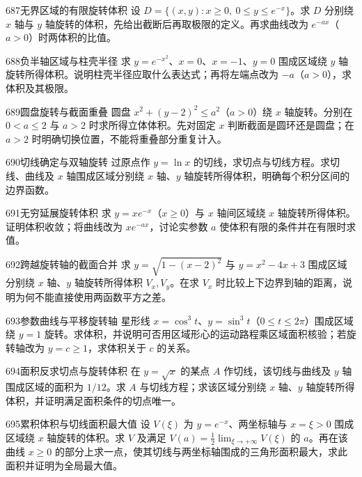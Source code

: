 \begin{exercise}{687}{无界区域的有限旋转体积}
设 $D=\{(x,y):x\ge0,\ 0\le y\le e^{-x}\}$。求 $D$ 分别绕 $x$ 轴与 $y$ 轴旋转的体积，先给出截断后再取极限的定义。再求曲线改为 $e^{-ax}$（$a>0$）时两体积的比值。
\end{exercise}
\begin{exercise}{688}{负半轴区域与柱壳半径}
求 $y=e^{-x^2}$、$x=0$、$x=-1$、$y=0$ 围成区域绕 $y$ 轴旋转所得体积。说明柱壳半径应取什么表达式；再将左端点改为 $-a$（$a>0$），求体积及其极限。
\end{exercise}
\begin{exercise}{689}{圆盘旋转与截面重叠}
圆盘 $x^2+(y-2)^2\le a^2$（$a>0$）绕 $x$ 轴旋转。分别在 $0<a\le2$ 与 $a>2$ 时求所得立体体积。先对固定 $x$ 判断截面是圆环还是圆盘；在 $a>2$ 时明确切换位置，不能将重叠部分重复计入。
\end{exercise}
\begin{exercise}{690}{切线确定与双轴旋转}
过原点作 $y=\ln x$ 的切线，求切点与切线方程。求切线、曲线及 $x$ 轴围成区域分别绕 $x$ 轴、$y$ 轴旋转所得体积，明确每个积分区间的边界函数。
\end{exercise}
\begin{exercise}{691}{无穷延展旋转体积}
求 $y=xe^{-x}$（$x\ge0$）与 $x$ 轴间区域绕 $x$ 轴旋转所得体积。证明体积收敛；将曲线改为 $xe^{-ax}$，讨论实参数 $a$ 使体积有限的条件并在有限时求值。
\end{exercise}
\begin{exercise}{692}{跨越旋转轴的截面合并}
求 $y=\sqrt{1-(x-2)^2}$ 与 $y=x^2-4x+3$ 围成区域分别绕 $x$ 轴、$y$ 轴旋转所得体积 $V_x,V_y$。在求 $V_x$ 时比较上下边界到轴的距离，说明为何不能直接使用两函数平方之差。
\end{exercise}
\begin{exercise}{693}{参数曲线与平移旋转轴}
星形线 $x=\cos^3t$、$y=\sin^3t$（$0\le t\le2\pi$）围成区域绕 $y=1$ 旋转。求体积，并说明可否用区域形心的运动路程乘区域面积核验；若旋转轴改为 $y=c\ge1$，求体积关于 $c$ 的关系。
\end{exercise}
\begin{exercise}{694}{面积反求切点与旋转体积}
在 $y=\sqrt x$ 的某点 $A$ 作切线，该切线与曲线及 $y$ 轴围成区域的面积为 $1/12$。求 $A$ 与切线方程；求该区域分别绕 $x$ 轴、$y$ 轴旋转所得体积，并证明满足面积条件的切点唯一。
\end{exercise}
\begin{exercise}{695}{累积体积与切线面积最大值}
设 $V(\xi)$ 为 $y=e^{-x}$、两坐标轴与 $x=\xi>0$ 围成区域绕 $x$ 轴旋转的体积。求 $V$ 及满足 $V(a)=\frac12\lim_{\xi\to+\infty}V(\xi)$ 的 $a$。再在该曲线 $x\ge0$ 的部分上求一点，使其切线与两坐标轴围成的三角形面积最大，求此面积并证明为全局最大值。
\end{exercise}
